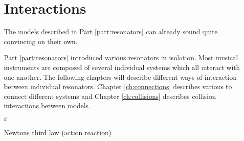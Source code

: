 \chapter*{Interactions}
The models described in Part \ref{part:resonators} can already sound quite convincing on their own. 

Part \ref{part:resonators} introduced various resonators in isolation. Most musical instruments are composed of several individual systems which all interact with one another. The following chapters will describe different ways of interaction between individual resonators. Chapter \ref{ch:connections} describes various to connect different systems and Chapter \ref{ch:collisions} describes collision interactions between models. 


$\varepsilon$

Newtons third law (action reaction)

